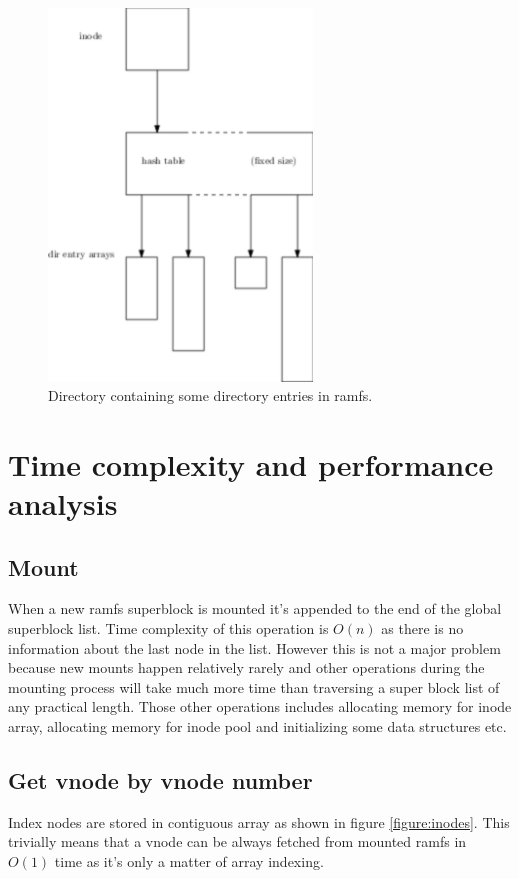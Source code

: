 \begin{figure}
  \center
  \includegraphics[width=7cm]{pics/dir}
  \caption{Directory containing some directory entries in ramfs.}
  \label{figure:dir}
\end{figure}


\section{Time complexity and performance analysis}

\subsection{Mount}

When a new ramfs superblock is mounted it's appended to the end of the global
superblock list. Time complexity of this operation is $O(n)$ as there is no
information about the last node in the list. However this is not a major
problem because new mounts happen relatively rarely and other operations during
the mounting process will take much more time than traversing a super block list
of any practical length. Those other operations includes allocating memory for
inode array, allocating memory for inode pool and initializing some data
structures etc.

\subsection{Get vnode by vnode number}

Index nodes are stored in contiguous array as shown in figure
\ref{figure:inodes}. This trivially means that a vnode can be always fetched
from mounted ramfs in $O(1)$ time as it's only a matter of array indexing.

